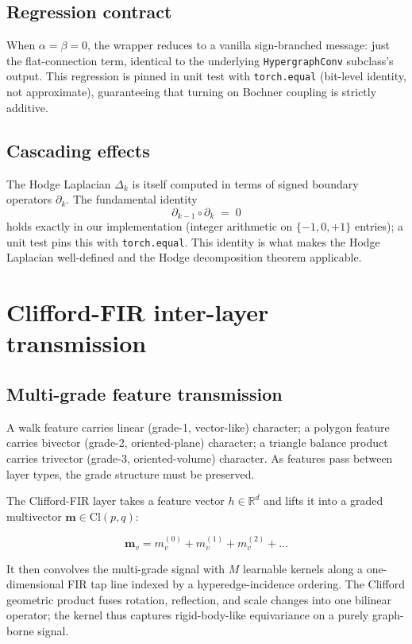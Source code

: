 \documentclass[11pt,a4paper]{article}
\begin{document}
\subsection{Regression contract}

When $\alpha = \beta = 0$, the wrapper reduces to a vanilla
sign-branched message: just the flat-connection term, identical to
the underlying \texttt{HypergraphConv} subclass's output. This
regression is pinned in unit test with \texttt{torch.equal}
(bit-level identity, not approximate), guaranteeing that turning
on Bochner coupling is strictly additive.

\subsection{Cascading effects}

The Hodge Laplacian $\Delta_k$ is itself computed in terms of
signed boundary operators $\partial_k$. The fundamental identity
\[
\partial_{k-1} \circ \partial_k \;=\; 0
\]
holds exactly in our implementation (integer arithmetic on
$\{-1, 0, +1\}$ entries); a unit test pins this with
\texttt{torch.equal}. This identity is what makes the Hodge
Laplacian well-defined and the Hodge decomposition theorem
applicable.

\section{Clifford-FIR inter-layer transmission}

\subsection{Multi-grade feature transmission}

A walk feature carries linear (grade-1, vector-like) character; a
polygon feature carries bivector (grade-2, oriented-plane)
character; a triangle balance product carries trivector (grade-3,
oriented-volume) character. As features pass between layer types,
the grade structure must be preserved.

The Clifford-FIR layer takes a feature vector $h \in \mathbb{R}^d$
and lifts it into a graded multivector $\mathbf{m} \in \mathrm{Cl}(p, q)$:

\[
\mathbf{m}_v = m^{(0)}_v + m^{(1)}_v + m^{(2)}_v + \ldots
\]

It then convolves the multi-grade signal with $M$ learnable
kernels along a one-dimensional FIR tap line indexed by a
hyperedge-incidence ordering. The Clifford geometric product
fuses rotation, reflection, and scale changes into one bilinear
operator; the kernel thus captures rigid-body-like equivariance
on a purely graph-borne signal.
\end{document}
